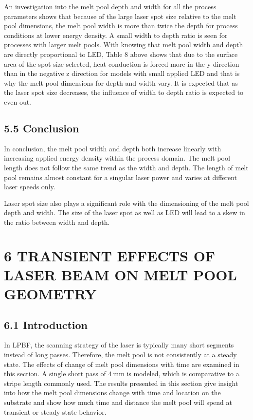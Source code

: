 \documentclass[10pt]{article}
\begin{document}
An investigation into the melt pool depth and width for all the process parameters shows that because of the large laser spot size relative to the melt pool dimensions, the melt pool width is more than twice the depth for process conditions at lower energy density. A small width to depth ratio is seen for processes with larger melt pools. With knowing that melt pool width and depth are directly proportional to LED, Table 8 above shows that due to the surface area of the spot size selected, heat conduction is forced more in the $\mathrm{y}$ direction than in the negative $\mathrm{z}$ direction for models with small applied LED and that is why the melt pool dimensions for depth and width vary. It is expected that as the laser spot size decreases, the influence of width to depth ratio is expected to even out.

\subsection*{5.5 Conclusion}
In conclusion, the melt pool width and depth both increase linearly with increasing applied energy density within the process domain. The melt pool length does not follow the same trend as the width and depth. The length of melt pool remains almost constant for a singular laser power and varies at different laser speeds only.

Laser spot size also plays a significant role with the dimensioning of the melt pool depth and width. The size of the laser spot as well as LED will lead to a skew in the ratio between width and depth.

\section*{6 TRANSIENT EFFECTS OF LASER BEAM ON MELT POOL GEOMETRY}
\subsection*{6.1 Introduction}
In LPBF, the scanning strategy of the laser is typically many short segments instead of long passes. Therefore, the melt pool is not consistently at a steady state. The effects of change of melt pool dimensions with time are examined in this section. A single short pass of $4 \mathrm{~mm}$ is modeled, which is comparative to a stripe length commonly used. The results presented in this section give insight into how the melt pool dimensions change with time and location on the substrate and show how much time and distance the melt pool will spend at transient or steady state behavior.
\end{document}
